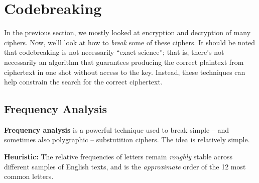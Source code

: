 \documentclass[letterpaper]{article}
\newcommand{\0}{\mathbf{0}}
\begin{document}
\newpage 
\section{Codebreaking}
In the previous section, we mostly looked at encryption and decryption of many ciphers. Now, we'll look at how to \emph{break} some of these ciphers. It should be noted that codebreaking is not necessarily ``exact science''; that is, there's not necessarily an algorithm that guarantees producing the correct plaintext from ciphertext in one shot without access to the key. Instead, these techniques can help constrain the search for the correct ciphertext. 

\subsection{Frequency Analysis}
\textbf{Frequency analysis} is a powerful technique used to break simple -- and sometimes also polygraphic -- substutition ciphers. The idea is relatively simple. 

\begin{displayquote}
    \textbf{Heuristic:} The relative frequencies of letters remain \emph{roughly} stable across different samples of English texts, and  is the \emph{approximate} order of the 12 most common letters.
\end{displayquote}
\end{document}
